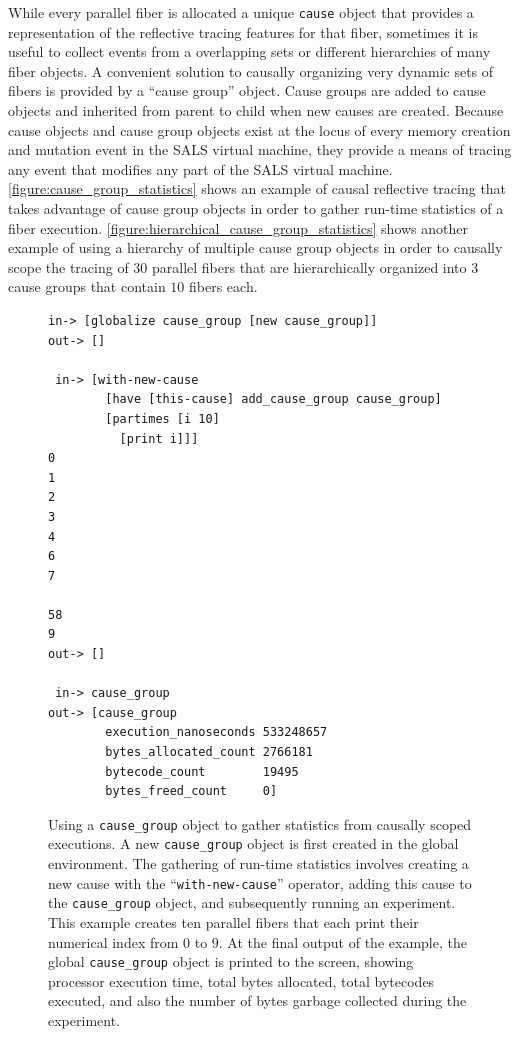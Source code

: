 While every parallel fiber is allocated a unique {\tt{cause}} object
that provides a representation of the reflective tracing features for
that fiber, sometimes it is useful to collect events from a
overlapping sets or different hierarchies of many fiber objects.  A
convenient solution to causally organizing very dynamic sets of fibers
is provided by a ``cause group'' object.  Cause groups are added to
cause objects and inherited from parent to child when new causes are
created.  Because cause objects and cause group objects exist at the
locus of every memory creation and mutation event in the SALS virtual
machine, they provide a means of tracing any event that modifies any
part of the SALS virtual machine.
{\mbox{\autoref{figure:cause_group_statistics}}} shows an example of
causal reflective tracing that takes advantage of cause group objects
in order to gather run-time statistics of a fiber execution.
{\mbox{\autoref{figure:hierarchical_cause_group_statistics}}} shows
another example of using a hierarchy of multiple cause group objects
in order to causally scope the tracing of $30$ parallel fibers that
are hierarchically organized into $3$ cause groups that contain $10$
fibers each.
\begin{figure}[h]
\centering
{\scriptsize
\begin{Verbatim}[frame=single]
 in-> [globalize cause_group [new cause_group]]
out-> []

 in-> [with-new-cause
        [have [this-cause] add_cause_group cause_group]
        [partimes [i 10]
          [print i]]]
0
1
2
3
4
6
7

58
9
out-> []

 in-> cause_group
out-> [cause_group
        execution_nanoseconds 533248657
        bytes_allocated_count 2766181
        bytecode_count        19495
        bytes_freed_count     0]
\end{Verbatim}
}
\caption[Using a {\tt{cause\_group}} object to gather statistics from
  causally scoped executions.]{Using a {\tt{cause\_group}} object to
  gather statistics from causally scoped executions.  A new
  {\tt{cause\_group}} object is first created in the global
  environment.  The gathering of run-time statistics involves creating
  a new cause with the ``{\tt{with-new-cause}}'' operator, adding this
  cause to the {\tt{cause\_group}} object, and subsequently running an
  experiment.  This example creates ten parallel fibers that each
  print their numerical index from $0$ to $9$.  At the final output of
  the example, the global {\tt{cause\_group}} object is printed to the
  screen, showing processor execution time, total bytes allocated,
  total bytecodes executed, and also the number of bytes garbage
  collected during the experiment.}
\label{figure:cause_group_statistics}
\end{figure}
